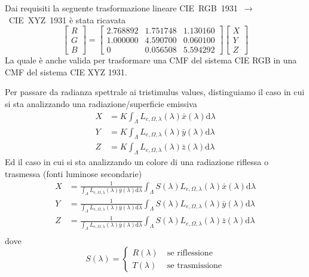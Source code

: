 Dai requisiti la seguente trasformazione lineare \mbox{CIE RGB 1931 $\rightarrow$ CIE XYZ 1931} \`e stata ricavata
\begin{equation}\label{chapter2:colorimetry:RGB2XYZ}
	\begin{bmatrix}
		R \\ G \\ B
	\end{bmatrix}
	=
	\begin{bmatrix}
		2.768892 & 1.751748 & 1.130160 \\
		1.000000 & 4.590700 & 0.060100 \\
		0 & 0.056508 & 5.594292
	\end{bmatrix}
	\begin{bmatrix}
		X \\ Y \\ Z
	\end{bmatrix}
\end{equation}
La quale \`e anche valida per trasformare una CMF del sistema CIE RGB in una CMF del sistema CIE XYZ 1931.\par
Per passare da radianza spettrale ai tristimulus values, distinguiamo il caso in cui si sta analizzando una radiazione/superficie emissiva
\begin{align}\label{chapter2:colorimetry:spectrum2XYZ4Source}
	X &= K\int_\Lambda L_{e,\Omega,\lambda}(\lambda)\bar{x}(\lambda)\mathrm{d}\lambda\\
	Y &= K\int_\Lambda L_{e,\Omega,\lambda}(\lambda)\bar{y}(\lambda)\mathrm{d}\lambda\\
	Z &= K\int_\Lambda L_{e,\Omega,\lambda}(\lambda)\bar{z}(\lambda)\mathrm{d}\lambda
\end{align}
Ed il caso in cui si sta analizzando un colore di una radiazione riflessa o trasmessa (fonti luminose secondarie)
\begin{align}
	X &= \frac{1}{\int_\Lambda L_{e,\Omega,\lambda}(\lambda)\bar{y}(\lambda)\mathrm{d}\lambda}
		\int_\Lambda S(\lambda)L_{e,\Omega,\lambda}(\lambda)\bar{x}(\lambda)\mathrm{d}\lambda\\
	Y &= \frac{1}{\int_\Lambda L_{e,\Omega,\lambda}(\lambda)\bar{y}(\lambda)\mathrm{d}\lambda}
		\int_\Lambda S(\lambda)L_{e,\Omega,\lambda}(\lambda)\bar{y}(\lambda)\mathrm{d}\lambda\\
	Z &= \frac{1}{\int_\Lambda L_{e,\Omega,\lambda}(\lambda)\bar{y}(\lambda)\mathrm{d}\lambda}
		\int_\Lambda S(\lambda)L_{e,\Omega,\lambda}(\lambda)\bar{z}(\lambda)\mathrm{d}\lambda\\
\end{align}
dove
\begin{equation}\label{chapter2:colorimetry:spectrum2XYZ4Rad}
	S(\lambda) = \left\{ \begin{aligned}
		R(\lambda)\;&\text{se riflessione}\\
		T(\lambda)\;&\text{se trasmissione}
	\end{aligned}\right.
\end{equation}
